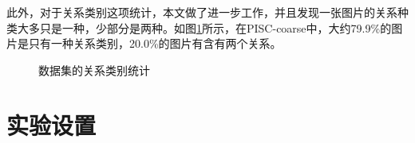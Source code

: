 此外，对于关系类别这项统计，本文做了进一步工作，并且发现一张图片的关系种类大多只是一种，少部分是两种。如图\ref{fig:exp-statistic}所示，在PISC-coarse中，大约79.9\%的图片是只有一种关系类别，20.0\%的图片有含有两个关系。

\begin{figure}[htpb]
	\centering
    \caption{数据集的关系类别统计}
	\vspace*{-3.5mm}
	\label{fig:exp-statistic}
\end{figure}

\section{实验设置}

